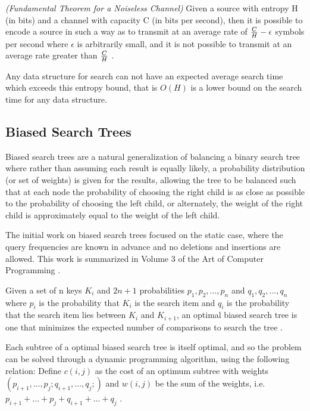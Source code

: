 \documentclass[mcs]{scsthesis}
\begin{document}
\begin{thm} \emph{(Fundamental Theorem for a Noiseless Channel)} 
Given a source with entropy H (in bits) and a channel with capacity C (in bits
per second), then it is possible to encode a source in such a way as to
transmit at an average rate of \({C \over H} - \epsilon\) symbols per second
where \(\epsilon\) is arbitrarily small, and it is not possible to transmit
at an average rate greater than \(C \over H\) \cite{claudeshannonwasagod}.
\end{thm}

Any data structure for search can not have an expected average search time which
exceeds this entropy bound, that is \(O(H)\) is a lower bound on the search time
for any data structure.

\subsection{Biased Search Trees}

Biased search trees are a natural generalization of balancing a binary search
tree where rather than assuming each result is equally likely, a probability
distribution (or set of weights) is given for the results, allowing the tree to
be balanced such that at each node the probability of choosing the right child
is as close as possible to the probability of choosing the left child, or
alternately, the weight of the right child is approximately equal to the weight
of the left child.

The initial work on biased search trees focused on the static case, where
the query frequencies are known in advance and no deletions and insertions
are allowed. This work is summarized in Volume 3 of the Art of Computer
Programming \cite{knuth}.

Given a set of n keys \(K_i\) and \(2n + 1\) probabilities
\(p_1, p_2, ..., p_n\) and \(q_1, q_2, ..., q_n\) where \(p_i\) is the
probability that \(K_i\) is the search item and \(q_i\) is the
probability that the search item lies between \(K_i\) and \(K_{i+1}\), an
optimal biased search tree is one that minimizes the expected number of
comparisons to search the tree \cite{knuth}.

Each subtree of a optimal biased search tree is itself optimal, and so the
problem can be solved through a dynamic programming algorithm, using the
following relation: Define \( c(i,j)\) as the cost of an optimum subtree with
weights \((p_{i+1}, ..., p_j; q_{i+1}, ..., q_j;)\) and \(w(i, j)\) be the
sum of the weights, i.e. \(p_{i+1} + ... + p_j + q_{i + 1} + ... + q_j \)
\cite{knuth}.
\end{document}
